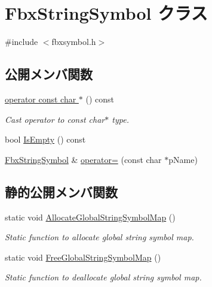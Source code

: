 \hypertarget{class_fbx_string_symbol}{}\section{Fbx\+String\+Symbol クラス}
\label{class_fbx_string_symbol}


{\ttfamily \#include $<$fbxsymbol.\+h$>$}

\subsection*{公開メンバ関数}
\begin{DoxyCompactItemize}
\item 
\hyperlink{class_fbx_string_symbol_ab73c7e02c66db24f6f570730b8f4c0ad}{operator const char $\ast$} () const
\begin{DoxyCompactList}\small\item\em Cast operator to const char$\ast$ type. \end{DoxyCompactList}\item 
bool \hyperlink{class_fbx_string_symbol_ad3c688920d30664d24027e5c5d8e380a}{Is\+Empty} () const
\item 
\hyperlink{class_fbx_string_symbol}{Fbx\+String\+Symbol} \& \hyperlink{class_fbx_string_symbol_a603854f158e237324bce01f8947c55b4}{operator=} (const char $\ast$p\+Name)
\end{DoxyCompactItemize}
\subsection*{静的公開メンバ関数}
\begin{DoxyCompactItemize}
\item 
static void \hyperlink{class_fbx_string_symbol_a1cee4d23670bba6901cbf8ed23b494de}{Allocate\+Global\+String\+Symbol\+Map} ()
\begin{DoxyCompactList}\small\item\em Static function to allocate global string symbol map. \end{DoxyCompactList}\item 
static void \hyperlink{class_fbx_string_symbol_ae2abd3332bb370ee215955e77f21e906}{Free\+Global\+String\+Symbol\+Map} ()
\begin{DoxyCompactList}\small\item\em Static function to deallocate global string symbol map. \end{DoxyCompactList}\end{DoxyCompactItemize}
